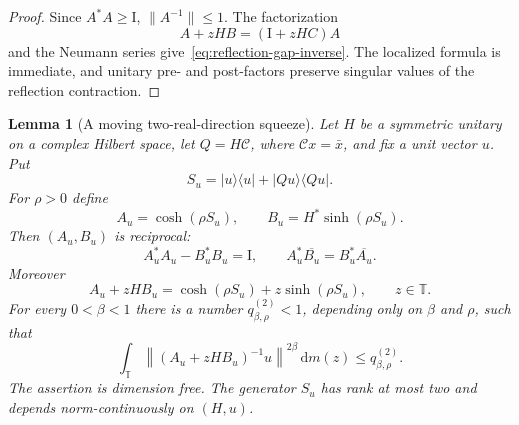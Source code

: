 \documentclass[11pt]{article}
\newtheorem{lemma}[theorem]{Lemma}
\theoremstyle{remark}
\newcommand{\T}{\mathbb T}
\newcommand{\Id}{\mathrm I}
\newcommand{\dd}{\,\mathrm d}
\begin{document}
\begin{proof}
Since $A^*A\geq\Id$, $\|A^{-1}\|\leq1$.  The factorization
\[
 A+zHB=(\Id+zHC)A
\]
and the Neumann series give~\eqref{eq:reflection-gap-inverse}.  The localized
formula is immediate, and unitary pre- and post-factors preserve singular
values of the reflection contraction.
\end{proof}

\begin{lemma}[A moving two-real-direction squeeze]
\label{lem:two-real-direction-squeeze}
Let $H$ be a symmetric unitary on a complex Hilbert space, let
$Q=H\mathcal C$, where $\mathcal Cx=\bar x$, and fix a unit vector $u$.
Put
\begin{equation}
 S_u=|u\rangle\langle u|+|Qu\rangle\langle Qu|.
 \label{eq:two-real-generator}
\end{equation}
For $\rho>0$ define
\begin{equation}
 A_u=\cosh(\rho S_u),\qquad
 B_u=H^*\sinh(\rho S_u).
 \label{eq:two-real-pair}
\end{equation}
Then $(A_u,B_u)$ is reciprocal:
\begin{equation}
 A_u^*A_u-B_u^*B_u=\Id,
 \qquad
 A_u^*\overline{B_u}=B_u^*\overline{A_u}.
 \label{eq:two-real-reciprocity}
\end{equation}
Moreover
\begin{equation}
 A_u+zHB_u
 =\cosh(\rho S_u)+z\sinh(\rho S_u),
 \qquad z\in\T.
 \label{eq:two-real-denominator}
\end{equation}
For every $0<\beta<1$ there is a number
$q^{(2)}_{\beta,\rho}<1$, depending only on $\beta$ and $\rho$, such that
\begin{equation}
 \int_\T
 \left\|(A_u+zHB_u)^{-1}u\right\|^{2\beta}\dd m(z)
 \leq q^{(2)}_{\beta,\rho}.
 \label{eq:two-real-contraction}
\end{equation}
The assertion is dimension free.  The generator $S_u$ has rank at most two
and depends norm-continuously on $(H,u)$.
\end{lemma}
\end{document}
